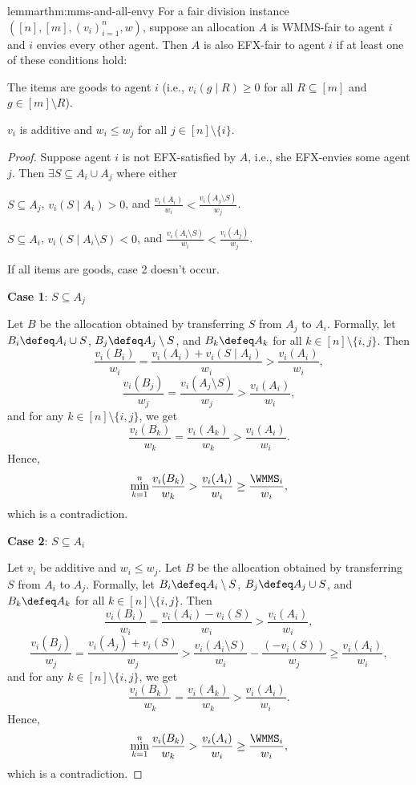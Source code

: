\begin{restatable}{lemma}{rthm:mms-and-all-envy}
\label{thm:mms-and-all-envy}
For a fair division instance $([n], [m], (v_i)_{i=1}^n, w)$,
suppose an allocation $A$ is WMMS-fair to agent $i$
and $i$ envies every other agent.
Then $A$ is also EFX-fair to agent $i$ if at least one of these conditions hold:
\begin{tightenum}
\item The items are goods to agent $i$ (i.e., $v_i(g \mid R) \ge 0$
    for all $R \subseteq [m]$ and $g \in [m] \setminus R$).
\item $v_i$ is additive and $w_i \le w_j$ for all $j \in [n] \setminus \{i\}$.
\end{tightenum}
\end{restatable}
\begin{proof}
Suppose agent $i$ is not EFX-satisfied by $A$, i.e., she EFX-envies some agent $j$.
Then $\exists S \subseteq A_i \cup A_j$ where either

\begin{tightenum}
\item $S \subseteq A_j$, $v_i(S \mid A_i) > 0$, and
    $\displaystyle \frac{v_i(A_i)}{w_i} < \frac{v_i(A_j \setminus S)}{w_j}$.
\item $S \subseteq A_i$, $v_i(S \mid A_i \setminus S) < 0$, and
    $\displaystyle \frac{v_i(A_i \setminus S)}{w_i} < \frac{v_i(A_j)}{w_j}$.
\end{tightenum}

If all items are goods, case 2 doesn't occur.

\textbf{Case 1}: $S \subseteq A_j$

Let $B$ be the allocation obtained by transferring $S$ from $A_j$ to $A_i$.
Formally, let $B_i \defeq A_i \cup S$, $B_j \defeq A_j \setminus S$,
and $B_k \defeq A_k$ for all $k \in [n] \setminus \{i, j\}$. Then
\[ \frac{v_i(B_i)}{w_i} = \frac{v_i(A_i) + v_i(S \mid A_i)}{w_i} > \frac{v_i(A_i)}{w_i}, \]
\[ \frac{v_i(B_j)}{w_j} = \frac{v_i(A_j \setminus S)}{w_j} > \frac{v_i(A_i)}{w_i}, \]
and for any $k \in [n] \setminus \{i, j\}$, we get
\[ \frac{v_i(B_k)}{w_k} = \frac{v_i(A_k)}{w_k} > \frac{v_i(A_i)}{w_i}. \]
Hence,
\[ \min_{k=1}^n \frac{v_i(B_k)}{w_k} > \frac{v_i(A_i)}{w_i} \ge \frac{\WMMS_i}{w_i}, \]
which is a contradiction.

\textbf{Case 2}: $S \subseteq A_i$

Let $v_i$ be additive and $w_i \le w_j$.
Let $B$ be the allocation obtained by transferring $S$ from $A_i$ to $A_j$. Formally,
let $B_i \defeq A_i \setminus S$, $B_j \defeq A_j \cup S$,
and $B_k \defeq A_k$ for all $k \in [n] \setminus \{i, j\}$. Then
\[ \frac{v_i(B_i)}{w_i} = \frac{v_i(A_i) - v_i(S)}{w_i} > \frac{v_i(A_i)}{w_i}, \]
\[ \frac{v_i(B_j)}{w_j} = \frac{v_i(A_j) + v_i(S)}{w_j} > \frac{v_i(A_i \setminus S)}{w_i} - \frac{(-v_i(S))}{w_j} \ge \frac{v_i(A_i)}{w_i}, \]
and for any $k \in [n] \setminus \{i, j\}$, we get
\[ \frac{v_i(B_k)}{w_k} = \frac{v_i(A_k)}{w_k} > \frac{v_i(A_i)}{w_i}. \]
Hence,
\[ \min_{k=1}^n \frac{v_i(B_k)}{w_k} > \frac{v_i(A_i)}{w_i} \ge \frac{\WMMS_i}{w_i}, \]
which is a contradiction.
\end{proof}

